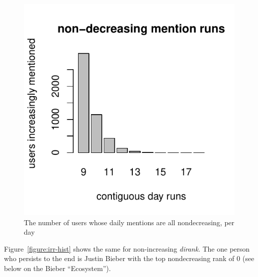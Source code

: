 \documentclass[10pt,oneside]{memoir}
\begin{document}

\begin{figure}
\begin{center}
    \includegraphics{figures/nnm-hist}
    \caption{The number of users whose daily mentions are all nondecreasing, per day}
    \label{figure:nnm-hist}
\end{center}
\end{figure}
Figure~\ref{figure:irr-hist} shows the same for non-increasing {\itshape dirank}.  The one person who persists to the end is Justin Bieber with the top nondecreasing rank of 0 (see below on the Bieber ``Ecosystem'').



\end{document}
